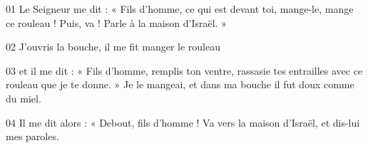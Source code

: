 01 Le Seigneur me dit : « Fils d’homme, ce qui est devant toi, mange-le, mange ce rouleau ! Puis, va ! Parle à la maison d’Israël. »

02 J’ouvris la bouche, il me fit manger le rouleau

03 et il me dit : « Fils d’homme, remplis ton ventre, rassasie tes entrailles avec ce rouleau que je te donne. » Je le mangeai, et dans ma bouche il fut doux comme du miel.

04 Il me dit alors : « Debout, fils d’homme ! Va vers la maison d’Israël, et dis-lui mes paroles.
